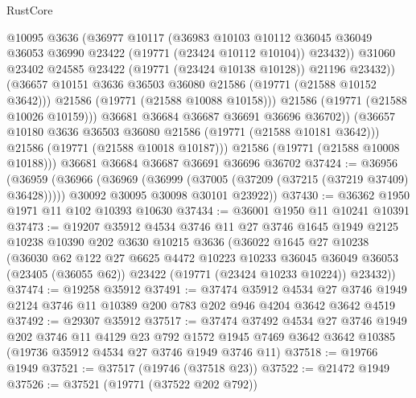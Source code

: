 \begin{lexlean}{RustCore}
\begin{coremodule}
                    @10095
                    @3636
                    (@36977
                      @10117
                      (@36983
                        @10103
                        @10112
                        @36045
                        @36049
                        @36053
                        @36990
                        @23422
                        (@19771 (@23424 @10112 @10104))
                        @23432))
                    @31060
                    @23402
                    @24585
                    @23422
                    (@19771 (@23424 @10138 @10128))
                    @21196
                    @23432))
                (@36657 @10151 @3636 @36503 @36080 @21586 (@19771 (@21588 @10152 @3642)))
                @21586
                (@19771 (@21588 @10088 @10158)))
              @21586
              (@19771 (@21588 @10026 @10159)))
            @36681
            @36684
            @36687
            @36691
            @36696
            @36702))
        (@36657 @10180 @3636 @36503 @36080 @21586 (@19771 (@21588 @10181 @3642)))
        @21586
        (@19771 (@21588 @10018 @10187)))
      @21586
      (@19771 (@21588 @10008 @10188)))
    @36681
    @36684
    @36687
    @36691
    @36696
    @36702
@37424 := @36956
    (@36959
      (@36966
        (@36969 (@36999 (@37005 (@37209 (@37215 (@37219 @37409) @36428)))))
        @30092
        @30095
        @30098
        @30101
        @23922))
@37430 := @36362 @1950 @1971 @11 @102 @10393 @10630
@37434 := @36001 @1950 @11 @10241 @10391
@37473 := @19207
    @35912
    @4534
    @3746
    @11
    @27
    @3746
    @1645
    @1949
    @2125
    @10238
    @10390
    @202
    @3630
    @10215
    @3636
    (@36022
      @1645
      @27
      @10238
      (@36030
        @62
        @122
        @27
        @6625
        @4472
        @10223
        @10233
        @36045
        @36049
        @36053
        (@23405 (@36055 @62))
        @23422
        (@19771 (@23424 @10233 @10224))
        @23432))
@37474 := @19258 @35912
@37491 := @37474
    @35912
    @4534
    @27
    @3746
    @1949
    @2124
    @3746
    @11
    @10389
    @200
    @783
    @202
    @946
    @4204
    @3642
    @3642
    @4519
@37492 := @29307 @35912
@37517 := @37474
    @37492
    @4534
    @27
    @3746
    @1949
    @202
    @3746
    @11
    @4129
    @23
    @792
    @1572
    @1945
    @7469
    @3642
    @3642
    @10385
    (@19736 @35912 @4534 @27 @3746 @1949 @3746 @11)
@37518 := @19766 @1949
@37521 := @37517 (@19746 (@37518 @23))
@37522 := @21472 @1949
@37526 := @37521 (@19771 (@37522 @202 @792))

\end{coremodule}
\end{lexlean}
